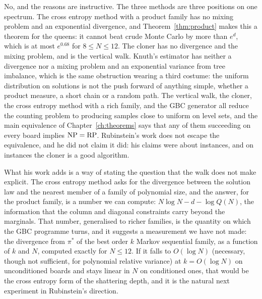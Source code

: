 No, and the reasons are instructive. The three methods are three positions on one spectrum. The cross entropy method with a product family has no mixing problem and an exponential divergence, and Theorem~\ref{thm:product} makes this a theorem for the queens: it cannot beat crude Monte Carlo by more than $e^{d}$, which is at most $e^{0.68}$ for $8 \le N \le 12$. The cloner has no divergence and the mixing problem, and is the vertical walk. Knuth's estimator has neither a divergence nor a mixing problem and an exponential variance from tree imbalance, which is the same obstruction wearing a third costume: the uniform distribution on solutions is not the push forward of anything simple, whether a product measure, a short chain or a random path. The vertical walk, the cloner, the cross entropy method with a rich family, and the GBC generator all reduce the counting problem to producing samples close to uniform on level sets, and the main equivalence of Chapter~\ref{ch:theorems} says that any of them succeeding on every board implies $\mathrm{NP} = \mathrm{RP}$. Rubinstein's work does not escape the equivalence, and he did not claim it did: his claims were about instances, and on instances the cloner is a good algorithm.

What his work adds is a way of stating the question that the walk does not make explicit. The cross entropy method asks for the divergence between the solution law and the nearest member of a family of polynomial size, and the answer, for the product family, is a number we can compute: $N \log N - d - \log Q(N)$, the information that the column and diagonal constraints carry beyond the marginals. That number, generalised to richer families, is the quantity on which the GBC programme turns, and it suggests a measurement we have not made: the divergence from $\pi^*$ of the best order $k$ Markov sequential family, as a function of $k$ and $N$, computed exactly for $N \le 12$. If it falls to $O(\log N)$ (necessary, though not sufficient, for polynomial relative variance) at $k = O(\log N)$ on unconditioned boards and stays linear in $N$ on conditioned ones, that would be the cross entropy form of the shattering depth, and it is the natural next experiment in Rubinstein's direction.
